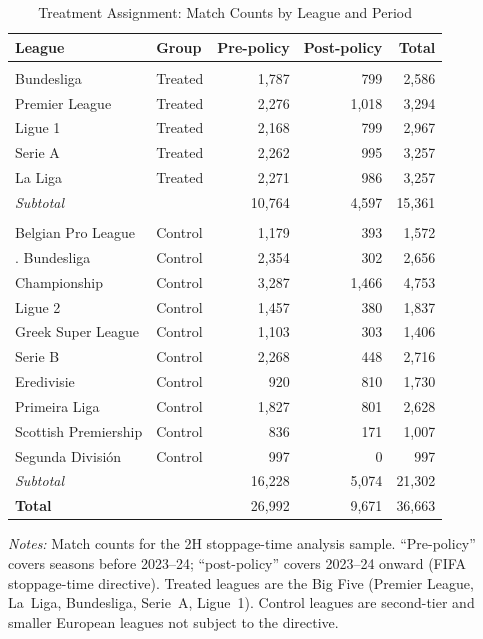 \begin{table}[htbp]
\centering
\begin{threeparttable}
\caption{Treatment Assignment: Match Counts by League and Period}
\label{tab:first_stage_summary}
\begin{tabular}{llrrr}
\toprule
League & Group & Pre-policy & Post-policy & Total \\
\midrule
\addlinespace
\multicolumn{5}{l}{\textit{Treated (Big 5)}} \\
\addlinespace[3pt]
\quad Bundesliga & Treated & 1,787 & 799 & 2,586 \\
\quad Premier League & Treated & 2,276 & 1,018 & 3,294 \\
\quad Ligue 1 & Treated & 2,168 & 799 & 2,967 \\
\quad Serie A & Treated & 2,262 & 995 & 3,257 \\
\quad La Liga & Treated & 2,271 & 986 & 3,257 \\
\addlinespace
\quad \textit{Subtotal} & & 10,764 & 4,597 & 15,361 \\
\addlinespace
\multicolumn{5}{l}{\textit{Control}} \\
\addlinespace[3pt]
\quad Belgian Pro League & Control & 1,179 & 393 & 1,572 \\
\quad 2. Bundesliga & Control & 2,354 & 302 & 2,656 \\
\quad Championship & Control & 3,287 & 1,466 & 4,753 \\
\quad Ligue 2 & Control & 1,457 & 380 & 1,837 \\
\quad Greek Super League & Control & 1,103 & 303 & 1,406 \\
\quad Serie B & Control & 2,268 & 448 & 2,716 \\
\quad Eredivisie & Control & 920 & 810 & 1,730 \\
\quad Primeira Liga & Control & 1,827 & 801 & 2,628 \\
\quad Scottish Premiership & Control & 836 & 171 & 1,007 \\
\quad Segunda División & Control & 997 & 0 & 997 \\
\addlinespace
\quad \textit{Subtotal} & & 16,228 & 5,074 & 21,302 \\
\midrule
\textbf{Total} & & 26,992 & 9,671 & 36,663 \\
\bottomrule
\end{tabular}
\begin{tablenotes}[flushleft]
\footnotesize
\item \textit{Notes:} Match counts for the 2H stoppage-time analysis sample.
``Pre-policy'' covers seasons before 2023--24; ``post-policy'' covers 2023--24 onward
(FIFA stoppage-time directive). Treated leagues are the Big Five (Premier League,
La~Liga, Bundesliga, Serie~A, Ligue~1). Control leagues are second-tier and
smaller European leagues not subject to the directive.
\end{tablenotes}
\end{threeparttable}
\end{table}
